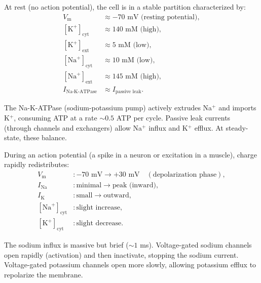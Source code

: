 \begin{definition}
\label{def:resting-state}
At rest (no action potential), the cell is in a stable partition characterized by:
\begin{equation}
\begin{aligned}
  V_{\text{m}} &\approx -70 \text{ mV (resting potential)},\\
  [\text{K}^+]_{\text{cyt}} &\approx 140 \text{ mM (high)},\\
  [\text{K}^+]_{\text{ext}} &\approx 5 \text{ mM (low)},\\
  [\text{Na}^+]_{\text{cyt}} &\approx 10 \text{ mM (low)},\\
  [\text{Na}^+]_{\text{ext}} &\approx 145 \text{ mM (high)},\\
  I_{\text{Na-K-ATPase}} &\approx I_{\text{passive leak}}.
\end{aligned}
\end{equation}

The Na-K-ATPase (sodium-potassium pump) actively extrudes Na$^+$ and imports K$^+$, consuming ATP at a rate $\sim 0.5$ ATP per cycle. Passive leak currents (through channels and exchangers) allow Na$^+$ influx and K$^+$ efflux. At steady-state, these balance.
\end{definition}

\begin{definition}
\label{def:action-potential-state}
During an action potential (a spike in a neuron or excitation in a muscle), charge rapidly redistributes:
\begin{equation}
\begin{aligned}
  V_{\text{m}} &: -70 \text{ mV} \to +30 \text{ mV} \quad (\text{depolarization phase}),\\
  I_{\text{Na}} &: \text{minimal} \to \text{peak (inward)},\\
  I_{\text{K}} &: \text{small} \to \text{outward},\\
  [\text{Na}^+]_{\text{cyt}} &: \text{slight increase},\\
  [\text{K}^+]_{\text{cyt}} &: \text{slight decrease}.
\end{aligned}
\end{equation}

The sodium influx is massive but brief ($\sim 1$ ms). Voltage-gated sodium channels open rapidly (activation) and then inactivate, stopping the sodium current. Voltage-gated potassium channels open more slowly, allowing potassium efflux to repolarize the membrane.
\end{definition}

